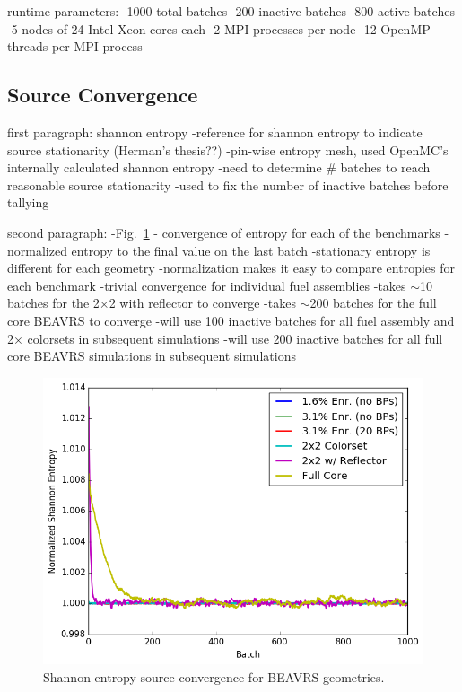 runtime parameters:
-1000 total batches
  -200 inactive batches
  -800 active batches
-5 nodes of 24 Intel Xeon cores each
-2 MPI processes per node
-12 OpenMP threads per MPI process

\subsection{Source Convergence}
\label{subsec:chap7-src-converge}

first paragraph: shannon entropy
-reference for shannon entropy to indicate source stationarity (Herman's thesis??)
-pin-wise entropy mesh, used OpenMC's internally calculated shannon entropy
-need to determine \# batches to reach reasonable source stationarity
-used to fix the number of inactive batches before tallying 

second paragraph:
-Fig.~\ref{fig:chap7-entropy} - convergence of entropy for each of the benchmarks
-normalized entropy to the final value on the last batch
-stationary entropy is different for each geometry
-normalization makes it easy to compare entropies for each benchmark
-trivial convergence for individual fuel assemblies
-takes $\sim$10 batches for the 2$\times$2 with reflector to converge
-takes $\sim$200 batches for the full core \ac{BEAVRS} to converge
-will use 100 inactive batches for all fuel assembly and 2$\times$ colorsets in subsequent simulations
-will use 200 inactive batches for all full core \ac{BEAVRS} simulations in subsequent simulations

\begin{figure}[h!]
  \centering
  \includegraphics[width=0.9\linewidth]{figures/benchmarks/entropy/entropy-all}
\caption[Shannon entropy source convergence for BEAVRS geometries]{Shannon entropy source convergence for BEAVRS geometries.}
\label{fig:chap7-entropy}
\end{figure}


